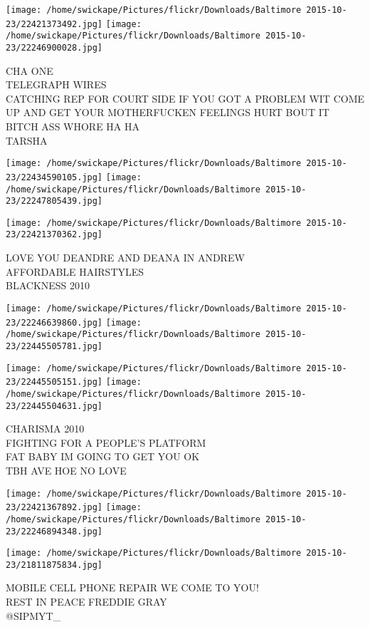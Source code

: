 \documentclass[10pt,letterpaper]{article}
\begin{document}
\texttt{[image: /home/swickape/Pictures/flickr/Downloads/Baltimore 2015-10-23/22421373492.jpg]}
\texttt{[image: /home/swickape/Pictures/flickr/Downloads/Baltimore 2015-10-23/22246900028.jpg]}

CHA ONE\\
TELEGRAPH WIRES\\
CATCHING REP FOR COURT SIDE IF YOU GOT A PROBLEM WIT COME UP AND GET YOUR MOTHERFUCKEN FEELINGS HURT BOUT IT BITCH ASS WHORE HA HA\\
TARSHA
\pagebreak

\texttt{[image: /home/swickape/Pictures/flickr/Downloads/Baltimore 2015-10-23/22434590105.jpg]}
\texttt{[image: /home/swickape/Pictures/flickr/Downloads/Baltimore 2015-10-23/22247805439.jpg]}

\vspace{0.25in}
\texttt{[image: /home/swickape/Pictures/flickr/Downloads/Baltimore 2015-10-23/22421370362.jpg]}

LOVE YOU DEANDRE AND DEANA IN ANDREW\\
AFFORDABLE HAIRSTYLES\\
BLACKNESS 2010
\pagebreak

\texttt{[image: /home/swickape/Pictures/flickr/Downloads/Baltimore 2015-10-23/22246639860.jpg]}
\texttt{[image: /home/swickape/Pictures/flickr/Downloads/Baltimore 2015-10-23/22445505781.jpg]}

\texttt{[image: /home/swickape/Pictures/flickr/Downloads/Baltimore 2015-10-23/22445505151.jpg]}
\texttt{[image: /home/swickape/Pictures/flickr/Downloads/Baltimore 2015-10-23/22445504631.jpg]}

CHARISMA 2010\\
FIGHTING FOR A PEOPLE'S PLATFORM\\
FAT BABY IM GOING TO GET YOU OK\\
TBH AVE HOE NO LOVE
\pagebreak

\texttt{[image: /home/swickape/Pictures/flickr/Downloads/Baltimore 2015-10-23/22421367892.jpg]}
\texttt{[image: /home/swickape/Pictures/flickr/Downloads/Baltimore 2015-10-23/22246894348.jpg]}

\vspace{0.25in}
\texttt{[image: /home/swickape/Pictures/flickr/Downloads/Baltimore 2015-10-23/21811875834.jpg]}

MOBILE CELL PHONE REPAIR WE COME TO YOU!\\
REST IN PEACE FREDDIE GRAY\\
@SIPMYT\_
\pagebreak
\end{document}
